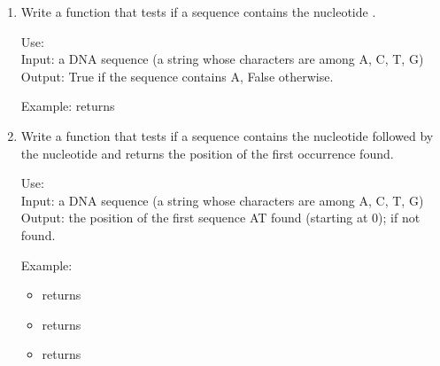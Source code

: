 \documentclass[11pt,class=report,crop=false]{standalone}
\begin{document}
\begin{activite}[DNA]

\begin{enumerate}
  \item Write a function  that tests if a sequence contains the nucleotide .
  
  \begin{fonction}[\ci{presence_of_A()}]
  Use:  \\
  Input: a DNA sequence (a string whose characters are among A, C, T, G) \\
  Output: \og{}True\fg{} if the sequence contains \og{}A\fg{}, \og{}False\fg{} otherwise.
  
  \medskip
    
  Example:  returns 
  \end{fonction}
  

   
  \item Write a function  that tests if a sequence contains the nucleotide  followed by the nucleotide  and returns the position of the first occurrence found.
  
  \begin{fonction}[\ci{position_of_AT()}]
  Use:  \\
  Input: a DNA sequence (a string whose characters are among A, C, T, G) \\
  Output: the position of the first sequence \og{}AT\fg{} found (starting at 0);  if not found.
  
  \medskip
    
  Example: 
  \begin{itemize}  
    \item {} returns 
    \item {} returns 
    \item {} returns 
  \end{itemize} 
  \end{fonction}
  

\end{enumerate}
\end{activite}
\end{document}
